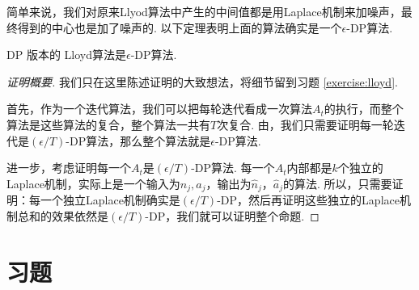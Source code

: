 简单来说，我们对原来Llyod算法中产生的中间值都是用Laplace机制来加噪声，最终得到的中心也是加了噪声的. 以下定理表明上面的算法确实是一个$\epsilon$-DP算法. 
\begin{theorem}\label{thm:lloyd}
    DP 版本的 Lloyd算法是$\epsilon$-DP算法.
\end{theorem}

\begin{proof}[证明概要]
我们只在这里陈述证明的大致想法，将细节留到习题 \ref{exercise:lloyd}.

首先，作为一个迭代算法，我们可以把每轮迭代看成一次算法$A_t$的执行，而整个算法是这些算法的复合，整个算法一共有$T$次复合. 由，我们只需要证明每一轮迭代是$(\epsilon/T)$-DP算法，那么整个算法就是$\epsilon$-DP算法.

进一步，考虑证明每一个$A_t$是$(\epsilon/T)$-DP算法. 每一个$A_t$内部都是$k$个独立的Laplace机制，实际上是一个输入为$n_j,a_j$，输出为$\hat{n}_j$，$\hat{a}_j$的算法. 所以，只需要证明：每一个独立Laplace机制确实是$(\epsilon/T)$-DP，然后再证明这些独立的Laplace机制总和的效果依然是$(\epsilon/T)$-DP，我们就可以证明整个命题.
\end{proof}

\section{习题}

